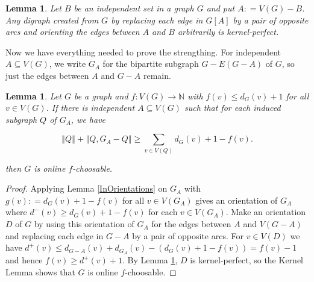 \documentclass[12pt]{article}
\theoremstyle{plain}
\newtheorem{lem}[thm]{Lemma}
\theoremstyle{definition}
\theoremstyle{remark}
\newcommand{\IN}{\mathbb{N}}
\newcommand{\size}[1]{\left\Vert#1\right\Vert}
\newcommand{\func}[3]{#1\colon #2 \rightarrow #3}
\newcommand{\DefinedAs}{\mathrel{\mathop:}=}
\begin{document}
\begin{lem}\label{KernelPerfect}
Let $B$ be an independent set in a graph $G$ and put $A \DefinedAs V(G) - B$.  Any digraph created from $G$ by replacing each edge in $G[A]$ by a pair of opposite arcs and orienting the edges between $A$ and $B$ arbitrarily is kernel-perfect.
\end{lem}

Now we have everything needed to prove the strengthing. For independent $A \subseteq V(G)$, we write $G_A$ for the bipartite subgraph $G - E(G-A)$ of $G$, so just the edges between $A$ and $G-A$ remain.

\begin{lem}\label{MicStrength}
	Let $G$ be a graph and $\func{f}{V(G)}{\IN}$ with $f(v) \le d_G(v) + 1$ for all $v \in V(G)$.  If there is independent $A \subseteq V(G)$ such that for each induced subgraph $Q$ of $G_A$, we have
	
	\[\size{Q} + \size{Q, G_A - Q}  \ge  \sum_{v \in V(Q)} d_G(v) + 1 - f(v).\]
	
	\noindent then $G$ is online $f$-choosable.
\end{lem}
\begin{proof}
	Applying Lemma \ref{InOrientations} on $G_A$ with $g(v) \DefinedAs d_G(v) + 1 - f(v)$ for all $v \in V(G_A)$ gives an orientation of $G_A$ where $d^-(v) \ge d_G(v) + 1 - f(v)$ for each $v \in V(G_A)$.  Make an orientation $D$ of $G$ by using this orientation of $G_A$ for the edges between $A$ and $V(G-A)$ and replacing each edge in $G-A$ by a pair of opposite arcs.  For $v \in V(D)$ we have $d^+(v) \le d_{G-A}(v) + d_{G_A}(v) - (d_G(v) + 1 - f(v)) = f(v) - 1$ and hence $f(v) \ge d^+(v) + 1$.  By Lemma \ref{KernelPerfect}, $D$ is kernel-perfect, so the Kernel Lemma shows that $G$ is online $f$-choosable.
\end{proof}
\end{document}

